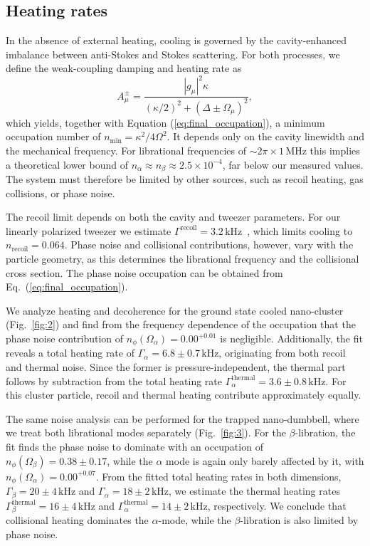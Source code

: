 \documentclass[reprint, amsmath, amssymb, superscriptaddress,showkeys,aps,pra]{revtex4-2}
\begin{document}
\subsection{Heating rates}
In the absence of external heating, cooling is governed by the cavity-enhanced imbalance between anti-Stokes and Stokes scattering. For both processes, we define the weak-coupling damping and heating rate as
\begin{equation}
    A_\mu^\pm = \frac{|g_\mu|^2 \kappa}{(\kappa/2)^2 + (\Delta \pm \Omega_\mu)^2},
   \label{eq:optomechanical-damping-rates} 
\end{equation}
which yields, together with Equation (\ref{eq:final_occupation}), a minimum occupation number of $n_\text{min}=\kappa^2/4\Omega^2$. It depends only on the cavity linewidth and the mechanical frequency. 
For librational frequencies of $\sim2\pi\times 1\,\text{MHz}$ this implies a theoretical lower bound of $n_\alpha\approx n_\beta\approx 2.5\times 10^{-4}$, far below our measured values. The system must therefore be limited by other sources, such as recoil heating, gas collisions, or phase noise. 

The recoil limit depends on both the cavity and tweezer parameters. For our linearly polarized tweezer we estimate $\Gamma^\text{recoil}=3.2\,\text{kHz}$~\cite{rudolph_theory_2021}, which limits cooling to $n_\text{recoil}=0.064$. 
Phase noise and collisional contributions, however, vary with the particle geometry, as this determines the librational frequency and the collisional cross section. The phase noise occupation can be obtained from Eq.~(\ref{eq:final_occupation}).

We analyze heating and decoherence for the ground state cooled nano-cluster (Fig.~\ref{fig:2}) and find from the frequency dependence of the occupation
that the phase noise contribution of $n_\phi(\Omega_\alpha)=0.00^{+0.01}$ is negligible. Additionally, the fit reveals a total heating rate of $\Gamma_\alpha=6.8\pm0.7\,\text{kHz}$, originating from both recoil and thermal noise. Since the former is pressure-independent, the thermal part follows by subtraction from the total heating rate $\Gamma_\alpha^\text{thermal}=3.6\pm0.8\,\text{kHz}$. For this cluster particle, recoil and thermal heating contribute approximately equally.

The same noise analysis can be performed for the trapped nano-dumbbell, where we treat both librational modes separately (Fig.~\ref{fig:3}). For the $\beta$-libration, the fit finds the phase noise to dominate with an occupation of $n_\phi(\Omega_\beta)=0.38\pm0.17$, while the $\alpha$ mode is again only barely affected by it, with $n_\phi(\Omega_\alpha)=0.00^ {+0.07}$.
From the fitted total heating rates in both dimensions, $\Gamma_\beta=20\pm4\,\text{kHz}$ and $\Gamma_\alpha=18\pm2\,\text{kHz}$, we estimate the thermal heating rates $\Gamma_\beta^\text{thermal}=16\pm4\,\text{kHz}$ and $\Gamma_\alpha^\text{thermal}=14\pm2\,\text{kHz}$, respectively. 
We conclude that collisional heating dominates the $\alpha$-mode, while the $\beta$-libration is also limited by phase noise.
\end{document}
